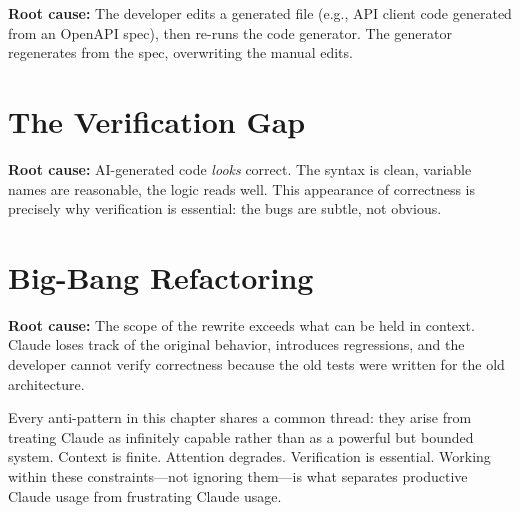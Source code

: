 \textbf{Root cause:} The developer edits a generated file (e.g., API client
code generated from an OpenAPI spec), then re-runs the code generator.
The generator regenerates from the spec, overwriting the manual edits.

\section{The Verification Gap}


\textbf{Root cause:} AI-generated code \emph{looks} correct.
The syntax is clean, variable names are reasonable, the logic reads well.
This appearance of correctness is precisely why verification is essential:
the bugs are subtle, not obvious.

\section{Big-Bang Refactoring}


\textbf{Root cause:} The scope of the rewrite exceeds what can be held
in context. Claude loses track of the original behavior, introduces
regressions, and the developer cannot verify correctness because the
old tests were written for the old architecture.

\begin{keyinsight}
Every anti-pattern in this chapter shares a common thread:
they arise from treating Claude as infinitely capable rather than
as a powerful but bounded system. Context is finite. Attention degrades.
Verification is essential. Working within these constraints---not
ignoring them---is what separates productive Claude usage from frustrating
Claude usage.
\end{keyinsight}
